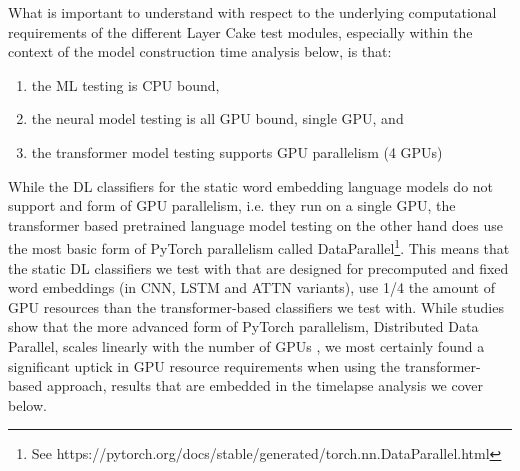 \documentclass[final]{clv2025}
\begin{document}
What is important to understand with respect to the underlying computational requirements of the different Layer Cake test modules, especially within the context of the model construction time analysis below, is that:
\begin{enumerate}
    \item the ML testing is CPU bound,
    \item the neural model testing is all GPU bound, single GPU, and 
    \item the transformer model testing supports GPU parallelism (4 GPUs)
\end{enumerate}

While the DL classifiers for the static word embedding language models do not support and form of GPU parallelism, i.e. they run on a single GPU, the transformer based pretrained language model testing on the other hand does use the most basic form of PyTorch parallelism called  DataParallel\footnote{See https://pytorch.org/docs/stable/generated/torch.nn.DataParallel.html}. This means that the static DL classifiers we test with that are designed for precomputed and fixed word embeddings (in CNN, LSTM and ATTN variants), use 1/4 the amount of GPU resources than the transformer-based classifiers we test with. While studies show that the more advanced form of PyTorch parallelism, Distributed Data Parallel, scales linearly with the number of GPUs \cite{li2020pytorchdistributedexperiencesaccelerating}, we most certainly found a significant uptick in GPU resource requirements when using the transformer-based approach, results that are embedded in the timelapse analysis we cover below.
\end{document}
